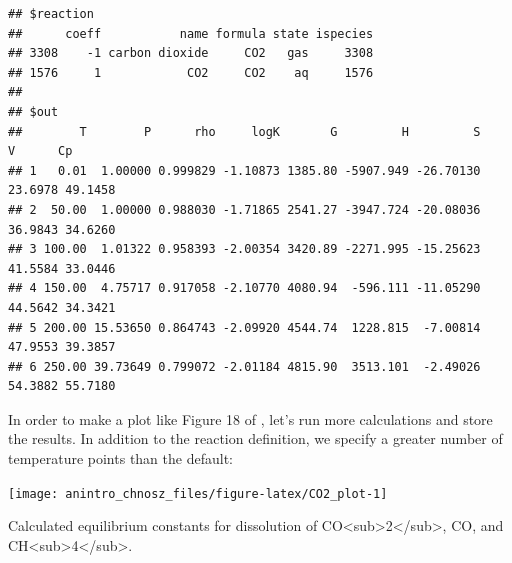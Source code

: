 \documentclass[]{tufte-book}
\begin{document}
\begin{verbatim}
## $reaction
##      coeff           name formula state ispecies
## 3308    -1 carbon dioxide     CO2   gas     3308
## 1576     1            CO2     CO2    aq     1576
## 
## $out
##        T        P      rho     logK       G         H         S       V      Cp
## 1   0.01  1.00000 0.999829 -1.10873 1385.80 -5907.949 -26.70130 23.6978 49.1458
## 2  50.00  1.00000 0.988030 -1.71865 2541.27 -3947.724 -20.08036 36.9843 34.6260
## 3 100.00  1.01322 0.958393 -2.00354 3420.89 -2271.995 -15.25623 41.5584 33.0446
## 4 150.00  4.75717 0.917058 -2.10770 4080.94  -596.111 -11.05290 44.5642 34.3421
## 5 200.00 15.53650 0.864743 -2.09920 4544.74  1228.815  -7.00814 47.9553 39.3857
## 6 250.00 39.73649 0.799072 -2.01184 4815.90  3513.101  -2.49026 54.3882 55.7180
\end{verbatim}

In order to make a plot like Figure 18 of \citet{MSS13}, let's run more
calculations and store the results. In addition to the reaction
definition, we specify a greater number of temperature points than the
default:

\begin{marginfigure}
\texttt{[image: anintro\_chnosz\_files/figure-latex/CO2\_plot-1]} \caption[Calculated equilibrium constants for dissolution of CO<sub>2</sub>, CO, and CH<sub>4</sub>]{Calculated equilibrium constants for dissolution of CO<sub>2</sub>, CO, and CH<sub>4</sub>.}\label{fig:CO2_plot}
\end{marginfigure}
\end{document}
